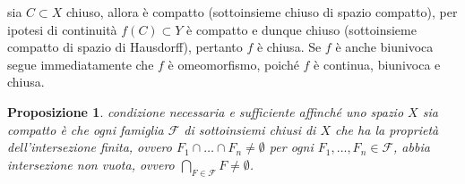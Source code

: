 \documentclass[oneside, 11pt]{amsbook}
\makeatletter
\newcommand{\0}{{(0)}}
\newcommand{\3}{{(3)}}
\theoremstyle{colonplain}
\newtheorem{prop}[thm]{Proposizione}
\theoremstyle{colondefinition}
\theoremstyle{colonremark}
\numberwithin{equation}{chapter}
\renewcommand{\proofname}{Dimostrazione}
\renewenvironment{proof}[1][\proofname]{\par
  \pushQED{\qed}%
  \normalfont \topsep6\p@\@plus6\p@\relax
  \trivlist
  \item[\hskip\labelsep\bfseries #1:]\ignorespaces
}{%
  \popQED\endtrivlist\@endpefalse
}
\makeatother
\begin{document}
\begin{proof}
sia $C \subset X$ chiuso, allora è compatto (sottoinsieme chiuso di spazio compatto), per ipotesi di continuità $f(C) \subset Y$ è compatto e dunque chiuso (sottoinsieme compatto di spazio di Hausdorff), pertanto $f$ è chiusa. Se $f$ è anche biunivoca segue immediatamente che $f$ è omeomorfismo, poiché $f$ è continua, biunivoca e chiusa.
\end{proof}
\begin{prop}\label{CompactSubbase}
condizione \textit{necessaria} e \textit{sufficiente} affinché uno spazio $X$ sia compatto è che ogni famiglia $\mathcal{F}$ di sottoinsiemi chiusi di $X$ che ha la proprietà dell'intersezione finita, ovvero $F_1 \cap \dots \cap F_n \neq \emptyset$ per ogni $F_1, \dots, F_n \in \mathcal{F}$, abbia intersezione non vuota, ovvero $\bigcap_{F \in \mathcal{F}} F \neq \emptyset$.
\end{prop}
\end{document}
